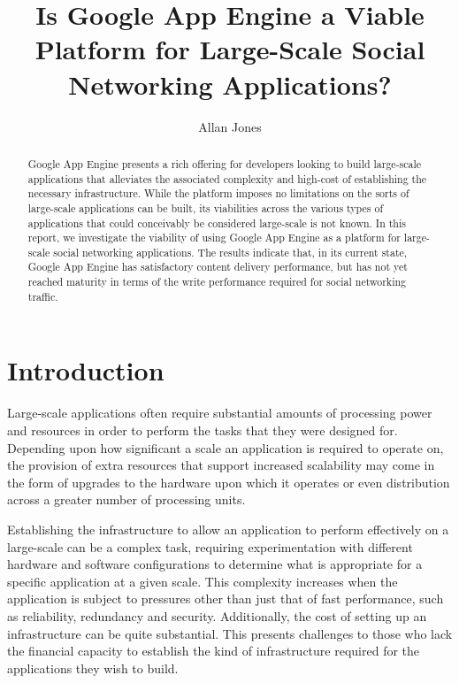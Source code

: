 \documentclass{article}
\title{Is Google App Engine a Viable Platform for Large-Scale Social Networking Applications?}
\author{Allan Jones}
\begin{document}
	\maketitle

\begin{abstract}

Google App Engine presents a rich offering for developers looking to build large-scale applications that alleviates the associated complexity and high-cost of establishing the necessary infrastructure. While the platform imposes no limitations on the sorts of large-scale applications can be built, its viabilities across the various types of applications that could conceivably be considered large-scale is not known. In this report, we investigate the viability of using Google App Engine as a platform for large-scale social networking applications. The results indicate that, in its current state, Google App Engine has satisfactory content delivery performance, but has not yet reached maturity in terms of the write performance required for social networking traffic.

\end{abstract}

\section{Introduction} %
\label{sec:introduction}

Large-scale applications often require substantial amounts of processing power and resources in order to perform the tasks that they were designed for. Depending upon how significant a scale an application is required to operate on, the provision of extra resources that support increased scalability may come in the form of upgrades to the hardware upon which it operates or even distribution across a greater number of processing units.

Establishing the infrastructure to allow an application to perform effectively on a large-scale can be a complex task, requiring experimentation with different hardware and software configurations to determine what is appropriate for a specific application at a given scale. This complexity increases when the application is subject to pressures other than just that of fast performance, such as reliability, redundancy and security. Additionally, the cost of setting up an infrastructure can be quite substantial. This presents challenges to those who lack the financial capacity to establish the kind of infrastructure required for the applications they wish to build.
\end{document}

